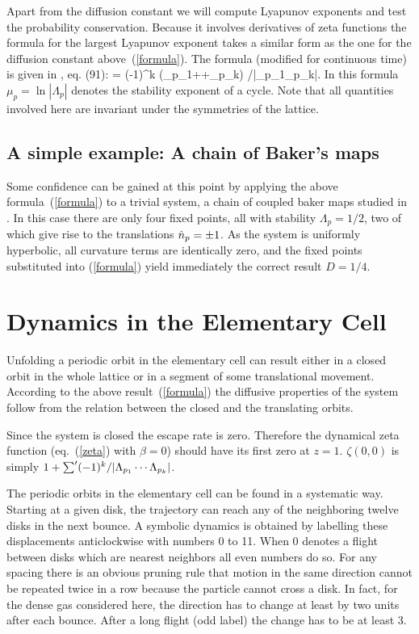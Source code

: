\documentclass[pre,twocolumn,groupedaddress,showpacs,showkeys]{revtex4}
\begin{document}
Apart from the diffusion constant we will compute Lyapunov
exponents and test the
probability conservation. Because it involves derivatives of zeta functions
the formula for the largest Lyapunov exponent takes a similar form as the one
for the diffusion constant above~(\ref{formula}).
The formula (modified for continuous time)
is given in , eq. (91):
\beq \lambda=
                       {\sumprime (-1)^k (\tau_{p_1}+\cdots +\tau_{p_k})
      /|\Lambda_{p_1}\cdots \Lambda_{p_k}|}\;. \label{eqliap} \eeq
In this formula $\mu_p=\ln|\Lambda_p|$ denotes the stability exponent of a
cycle. Note that all quantities involved here are invariant under the symmetries
of the lattice.

\subsection{A simple example: A chain of Baker's maps}
Some confidence can be gained at this point by applying the above
formula~(\ref{formula}) to a trivial system, a chain of coupled
baker maps studied in \cite{gasBaker}.
In this case there are only four fixed points, all with
stability $\Lambda_p=1/2$, two of
which give rise to the translations $\hat n_{p}=\pm 1$.
As the system is
uniformly hyperbolic, all curvature terms are identically zero,
and the fixed points substituted into (\ref{formula}) yield
immediately the correct result $D=1/4$.

\section{Dynamics in the Elementary Cell} \label{CELL}
Unfolding a periodic orbit in the elementary cell can
result either in a closed orbit in the whole lattice or in a segment of
some translational movement. According to the above result~(\ref{formula})
the diffusive properties of the system follow from the relation between
the closed and the translating orbits.

Since the system is closed the escape rate is zero. Therefore
the dynamical zeta function (eq.~(\ref{zeta}) with $\beta=0$) should have its
first zero at $z=1$. $\zeta(0,0)$
is simply $1+\mathop{{\sum}'} (-1)^k/|\Lambda_{p_1}\cdots \Lambda_{p_k}|$.

The periodic orbits in the elementary cell can be found in a systematic way.
Starting at a given disk, the trajectory can reach any of the neighboring
twelve disks in the next bounce.
A symbolic dynamics is obtained by labelling
these displacements anticlockwise with numbers 0 to 11. When 0 denotes
a flight between disks which are nearest neighbors all even numbers do so. For
any spacing there is an obvious pruning rule that motion
in the same direction cannot be repeated
twice in a row because the particle cannot cross a disk. In fact, for the
dense gas considered here,
the direction has to change at least by two units after each bounce.
After a long flight (odd label) the change has to be at least 3.
\end{document}
